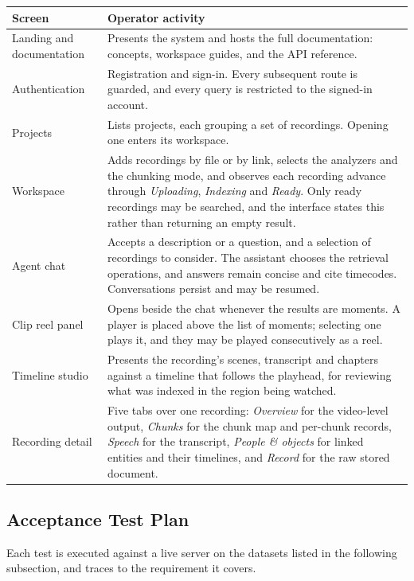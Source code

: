 \begin{table}[htbp]
\centering
\small
\begin{tabularx}{\textwidth}{@{}L{3.4cm}X@{}}
\toprule
\textbf{Screen} & \textbf{Operator activity} \\
\midrule
Landing and documentation & Presents the system and hosts the full documentation: concepts, workspace guides, and the API reference. \\
Authentication  & Registration and sign-in. Every subsequent route is guarded, and every query is restricted to the signed-in account. \\
Projects        & Lists projects, each grouping a set of recordings. Opening one enters its workspace. \\
Workspace       & Adds recordings by file or by link, selects the analyzers and the chunking mode, and observes each recording advance through \emph{Uploading}, \emph{Indexing} and \emph{Ready}. Only ready recordings may be searched, and the interface states this rather than returning an empty result. \\
Agent chat      & Accepts a description or a question, and a selection of recordings to consider. The assistant chooses the retrieval operations, and answers remain concise and cite timecodes. Conversations persist and may be resumed. \\
Clip reel panel & Opens beside the chat whenever the results are moments. A player is placed above the list of moments; selecting one plays it, and they may be played consecutively as a reel. \\
Timeline studio & Presents the recording's scenes, transcript and chapters against a timeline that follows the playhead, for reviewing what was indexed in the region being watched. \\
Recording detail & Five tabs over one recording: \emph{Overview} for the video-level output, \emph{Chunks} for the chunk map and per-chunk records, \emph{Speech} for the transcript, \emph{People \& objects} for linked entities and their timelines, and \emph{Record} for the raw stored document. \\
\bottomrule
\end{tabularx}
\end{table}

\subsection{Acceptance Test Plan}

Each test is executed against a live server on the datasets listed in the following
subsection, and traces to the requirement it covers.

